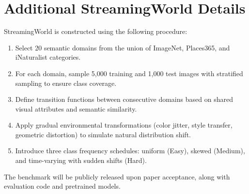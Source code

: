 \documentclass[11pt]{article}
\begin{document}
\section{Additional StreamingWorld Details}
\label{app:streaming}

StreamingWorld is constructed using the following procedure:
\begin{enumerate}
    \item Select 20 semantic domains from the union of ImageNet, Places365, and iNaturalist categories.
    \item For each domain, sample 5,000 training and 1,000 test images with stratified sampling to ensure class coverage.
    \item Define transition functions between consecutive domains based on shared visual attributes and semantic similarity.
    \item Apply gradual environmental transformations (color jitter, style transfer, geometric distortion) to simulate natural distribution shift.
    \item Introduce three class frequency schedules: uniform (Easy), skewed (Medium), and time-varying with sudden shifts (Hard).
\end{enumerate}

The benchmark will be publicly released upon paper acceptance, along with evaluation code and pretrained models.
\end{document}
